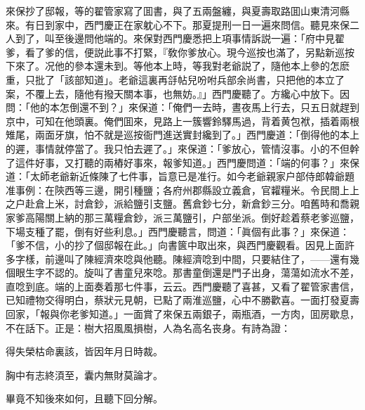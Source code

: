 來保抄了邸報，等的翟管家寫了囬書，與了五兩盤纏，與夏壽取路囬山東清河縣來。有日到家中，西門慶正在家躭心不下。那夏提刑一日一遍來問信。聽見來保二人到了，叫至後邊問他端的。來保對西門慶悉把上項事情訴説一遍：「府中見翟爹，看了爹的信，便説此事不打緊，『敎你爹放心。現今巡按也滿了，另點新巡按下來了。况他的參本還未到。等他本上時，等我對老爺説了，隨他本上參的怎麽重，只批了「該部知道」。老爺這裏再㧱帖兒吩咐兵部余尚書，只把他的本立了案，不覆上去，隨他有撥天關本事，也無妨。』」西門慶聽了。方纔心中放下。因問：「他的本怎倒還不到？」來保道：「俺們一去時，晝夜馬上行去，只五日就趕到京中，可知在他頭裏。俺們囬來，見路上一簇響鈴驛馬過，背着黄包袱，插着兩根雉尾，兩面牙旗，怕不就是巡按衙門進送實封纔到了。」西門慶道：「倒得他的本上的遲，事情就停當了。我只怕去遲了。」來保道：「爹放心，管情沒事。小的不但幹了這件好事，又打聽的兩樁好事來，報爹知道。」西門慶問道：「端的何事？」來保道：「太師老爺新近條陳了七件事，旨意已是准行。如今老爺親家户部侍郎韓爺題准事例：在陝西等三邊，開引種鹽；各府州郡縣設立義倉，官糶糧米。令民間上上之户赴倉上米，討倉鈔，派給鹽引支鹽。舊倉鈔七分，新倉鈔三分。咱舊時和喬親家爹高陽關上納的那三萬糧倉鈔，派三萬鹽引，户部坐派。倒好趁着蔡老爹巡鹽，下場支種了罷，倒有好些利息。」西門慶聽言，問道：「眞個有此事？」來保道：「爹不信，小的抄了個邸報在此。」向書篋中取出來，與西門慶觀看。因見上面許多字樣，前邊叫了陳經濟來唸與他聽。陳經濟唸到中間，只要結住了，——還有幾個眼生字不認的。旋叫了書童兒來唸。那書童倒還是門子出身，蕩蕩如流水不差，直唸到底。端的上面奏着那七件事，云云。西門慶聽了喜甚，又看了翟管家書信，已知禮物交得明白，蔡狀元見朝，已點了兩淮巡鹽，心中不勝歡喜。一面打發夏壽回家，「報與你老爹知道。」一面賞了來保五兩銀子，兩瓶酒，一方肉，囬房歇息，不在話下。正是：樹大招風風損樹，人為名高名丧身。有詩為證：

\begin{myquote}
得失榮枯命裏該，皆因年月日時裁。

胸中有志終湏至，囊内無財莫論才。
\end{myquote}

畢竟不知後來如何，且聽下回分解。


